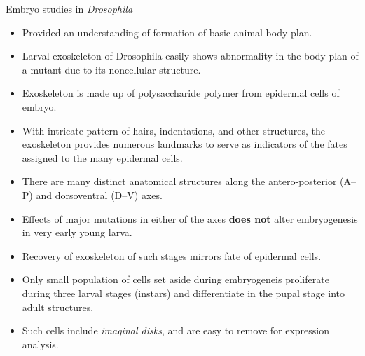 \documentclass[11pt,dvipsnames,ignorenonframetext,aspectratio=169]{beamer}
\providecommand{\tightlist}{%
  \setlength{\itemsep}{0pt}\setlength{\parskip}{0pt}}
\begin{document}
\begin{frame}{Embryo studies in \emph{Drosophila}}
\protect\hypertarget{embryo-studies-in-drosophila}{}

\begin{itemize}
\tightlist
\item
  Provided an understanding of formation of basic animal body plan.
\item
  Larval exoskeleton of Drosophila easily shows abnormality in the body
  plan of a mutant due to its noncellular structure.
\item
  Exoskeleton is made up of polysaccharide polymer from epidermal cells
  of embryo.
\item
  With intricate pattern of hairs, indentations, and other structures,
  the exoskeleton provides numerous landmarks to serve as indicators of
  the fates assigned to the many epidermal cells.
\item
  There are many distinct anatomical structures along the
  antero-posterior (A--P) and dorsoventral (D--V) axes.
\end{itemize}

\end{frame}

\begin{frame}{}
\protect\hypertarget{section-4}{}

\begin{itemize}
\tightlist
\item
  Effects of major mutations in either of the axes \textbf{does not}
  alter embryogenesis in very early young larva.
\item
  Recovery of exoskeleton of such stages mirrors fate of epidermal
  cells.
\item
  Only small population of cells set aside during embryogeneis
  proliferate during three larval stages (instars) and differentiate in
  the pupal stage into adult structures.
\item
  Such cells include \emph{imaginal disks}, and are easy to remove for
  expression analysis.
\end{itemize}

\end{frame}
\end{document}
